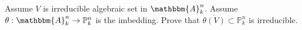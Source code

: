 \documentclass{ctexart}
\newif\ifpreface
\begin{document}
\large
\setlength{\baselineskip}{1.2em}
\ifpreface
	
	\newgeometry{left=2cm,right=2cm,top=2cm,bottom=2cm}
\else
	\maketitle
\fi
\begin{problem}
Assume \(V\) is irreducible algebraic set in \(\mathbbm{A}_k^{n}\).
Assume \(\theta:\mathbbm{A}_k^{n} \to \mathbb{P}_k^{n}\) is the imbedding.
Prove that \(\overline{\theta(V)} \subset \mathbb{P}_k^{n}\) is irreducible.
\end{problem}

\begin{solution}

\end{solution}
\end{document}

